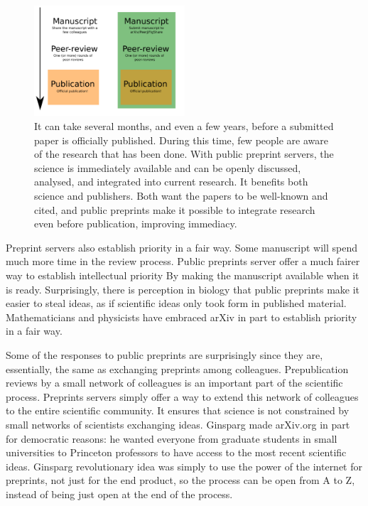 \documentclass[letterpaper,twocolumn,superscriptaddress,showkeys]{revtex4}
\begin{document}


\begin{figure}[ht!] \centering\includegraphics[width=0.50\textwidth]{map.pdf}
\caption { It can take several months, and even a few years, before a submitted
paper is officially published. During this time, few people are aware of the
research that has been done. With public preprint servers, the science is
immediately available and can be openly discussed, analysed, and integrated into
current research. It benefits both science and publishers. Both want the papers
to be well-known and cited, and public preprints make it possible to integrate
research even before publication, improving immediacy.  } \label{fig:map}
\end{figure}

Preprint servers also establish priority in a fair way. Some manuscript will
spend much more time in the review process. Public preprints server offer a much
fairer way to establish intellectual priority By making the manuscript available
when it is ready. Surprisingly, there is perception in biology that public
preprints make it easier to steal ideas, as if scientific ideas only took form
in published material. Mathematicians and physicists have embraced arXiv in part
to establish priority in a fair way\cite{cal12}.

Some of the responses to public preprints are surprisingly since they are,
essentially, the same as exchanging preprints among colleagues. Prepublication
reviews by a small network of colleagues is an important part of the scientific
process. Preprints servers simply offer a way to extend this network of
colleagues to the entire scientific community. It ensures that science is not
constrained by small networks of scientists exchanging ideas. Ginsparg made
arXiv.org in part for democratic reasons: he wanted everyone from graduate
students in small universities to Princeton professors to have access to the
most recent scientific ideas. Ginsparg revolutionary idea was simply to use the
power of the internet for preprints, not just for the end product, so the
process can be open from A to Z, instead of being just open at the end of the
process.
\end{document}
